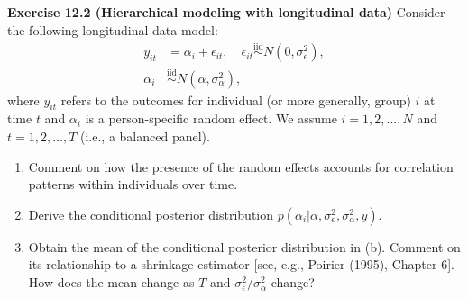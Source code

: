 \documentclass[11pt,a4paper]{article}
\numberwithin{equation}{questao}
\newenvironment{enunciado}{\par\begingroup\small}{\endgroup\par}
\begin{document}
\begin{enunciado}
\textbf{Exercise 12.2 (Hierarchical modeling with longitudinal data)} Consider the following longitudinal data model:
\begin{align}
y_{it}&=\alpha_i+\epsilon_{it},\quad \epsilon_{it}\overset{\text{iid}}{\sim}N(0,\sigma_\epsilon^2), \tag{12.6}\\
\alpha_i&\overset{\text{iid}}{\sim}N(\alpha,\sigma_\alpha^2), \tag{12.7}
\end{align}
where $y_{it}$ refers to the outcomes for individual (or more generally, group) $i$ at time $t$ and $\alpha_i$ is a
person-specific random effect. We assume $i=1,2,\dots,N$ and $t=1,2,\dots,T$ (i.e., a balanced panel).
\begin{enumerate}[label=(\alph*),leftmargin=2.4em,topsep=1pt,itemsep=1pt]
\item Comment on how the presence of the random effects accounts for correlation patterns within individuals over time.
\item Derive the conditional posterior distribution $p(\alpha_i|\alpha,\sigma_\epsilon^2,\sigma_\alpha^2,y)$.
\item Obtain the mean of the conditional posterior distribution in (b). Comment on its relationship to a shrinkage
estimator [see, e.g., Poirier (1995), Chapter 6]. How does the mean change as $T$ and $\sigma_\epsilon^2/\sigma_\alpha^2$ change?
\end{enumerate}


\end{enunciado}
\end{document}

